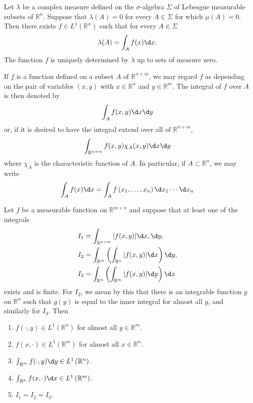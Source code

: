 \begin{theorem}
  Let $\lambda$ be a complex measure defined on the $\sigma$-algebra $\Sigma$ of Lebesgue measurable subsets of $\mathbb{R}^n$. Suppose that $\lambda(A)=0$ for every $A \in \Sigma$ for which $\mu(A)=0$. Then there exists $f \in L^1\left(\mathbb{R}^n\right)$ such that for every $A \in \Sigma$
  \[
\lambda(A)=\int_A f(x) \d x.
\]
The function $f$ is uniquely determined by $\lambda$ up to sets of measure zero.
\end{theorem}


\begin{para}
  If $f$ is a function defined on a subset $A$ of $\mathbb{R}^{n+m}$, we may regard $f$ as depending on the pair of variables $(x, y)$ with $x \in \mathbb{R}^n$ and $y \in \mathbb{R}^m$. The integral of $f$ over $A$ is then denoted by
  \[
  \int_A f(x, y) \d x \d y
  \]
  or, if it is desired to have the integral extend over all of $\mathbb{R}^{n+m}$,
  \[
  \int_{\mathbb{R}^{n+m}} f(x, y) \chi_A(x, y) \d x \d y
  \]
  where $\chi_A$ is the characteristic function of $A$. In particular, if $A \subset \mathbb{R}^n$, we may write
  \[
  \int_A f(x) \d x=\int_A f\left(x_1, \ldots, x_n\right) \d x_1 \cdots \d x_n
  \]
\end{para}


\begin{theorem}
  Let $f$ be a measurable function on $\mathbb{R}^{m+n}$ and suppose that at least one of the integrals
  \[
  \begin{aligned}
  I_1 & =\int_{\mathbb{R}^{n+m}}|f(x, y)| \d x, \d y, \\
  I_2 & =\int_{\mathbb{R}^m}\left(\int_{\mathbb{R}^n}|f(x, y)| \d x\right) \d y, \\
  I_3 & =\int_{\mathbb{R}^n}\left(\int_{\mathbb{R}^m}|f(x, y)| \d y\right) \d x
  \end{aligned}
  \]
  exists and is finite. For $I_2$, we mean by this that there is an integrable function $g$ on $\mathbb{R}^n$ such that $g(y)$ is equal to the inner integral for almost all $y$, and similarly for $I_3$. Then
  \begin{enumerate}[label = (\alph*)]
    \item $f(\cdot, y) \in L^1\left(\mathbb{R}^n\right)$ for almost all $y \in \mathbb{R}^m$.
    \item $f(x, \cdot) \in L^1\left(\mathbb{R}^m\right)$ for almost all $x \in \mathbb{R}^n$.
    \item $\int_{R^m} f(\cdot, y) \d y \in L^1\left(\mathbb{R}^n\right)$.
    \item $\int_{R^n} f(x, \cdot) \d x \in L^1\left(\mathbb{R}^m\right)$.
    \item $I_1=I_2=I_3$.
  \end{enumerate}
\end{theorem}


